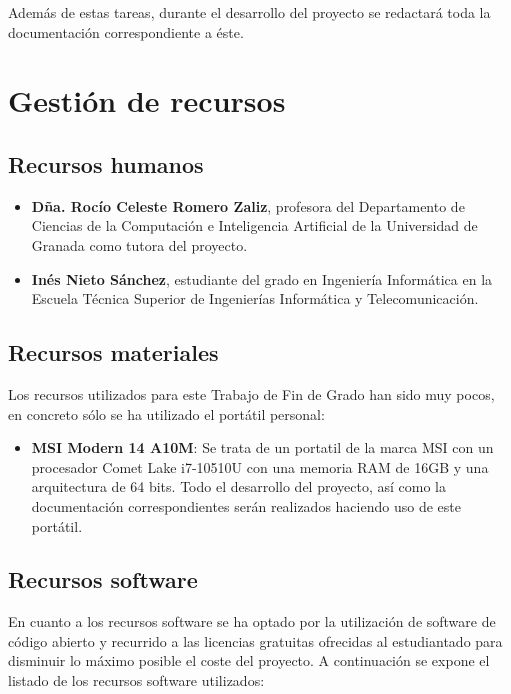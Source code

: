 Además de estas tareas, durante el desarrollo del proyecto se redactará toda la documentación correspondiente a éste.

\section{Gestión de recursos} \label{recursos}
\subsection{Recursos humanos}
\begin{itemize}
    \item \textbf{Dña. Rocío Celeste Romero Zaliz}, profesora del Departamento de Ciencias de la Computación e Inteligencia Artificial de la Universidad de Granada como tutora del proyecto.
    \item \textbf{Inés Nieto Sánchez}, estudiante del grado en Ingeniería Informática en la Escuela Técnica Superior de Ingenierías Informática y Telecomunicación.
\end{itemize}

\subsection{Recursos materiales} \label{materiales}
Los recursos utilizados para este Trabajo de Fin de Grado han sido muy pocos, en concreto sólo se ha utilizado el portátil personal:
\begin{itemize}
    \item \textbf{MSI Modern 14 A10M}: Se trata de un portatil de la marca MSI con un procesador Comet Lake i7-10510U con una memoria RAM de 16GB y una arquitectura de 64 bits. Todo el desarrollo del proyecto, así como la documentación correspondientes serán realizados haciendo uso de este portátil.
\end{itemize}
\subsection{Recursos software} \label{recursos-software}
En cuanto a los recursos software se ha optado por la utilización de software de código abierto y recurrido a las licencias gratuitas ofrecidas al estudiantado para disminuir lo máximo posible el coste del proyecto. A continuación se expone el listado de los recursos software utilizados:

